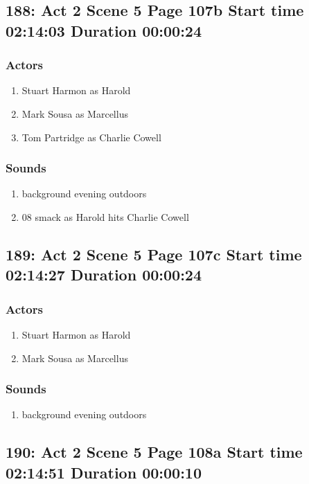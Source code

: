 \subsection{188: Act 2 Scene 5 Page 107b Start time 02:14:03 Duration 00:00:24}

\subsubsection{Actors}
\begin{enumerate}
\item Stuart Harmon as Harold
\item Mark Sousa as Marcellus
\item Tom Partridge as Charlie Cowell
\end{enumerate}

\subsubsection{Sounds}
\begin{enumerate}
\item background evening outdoors
\item 08 smack as Harold hits Charlie Cowell
\end{enumerate}
\subsection{189: Act 2 Scene 5 Page 107c Start time 02:14:27 Duration 00:00:24}

\subsubsection{Actors}
\begin{enumerate}
\item Stuart Harmon as Harold
\item Mark Sousa as Marcellus
\end{enumerate}

\subsubsection{Sounds}
\begin{enumerate}
\item background evening outdoors
\end{enumerate}
\subsection{190: Act 2 Scene 5 Page 108a Start time 02:14:51 Duration 00:00:10}
